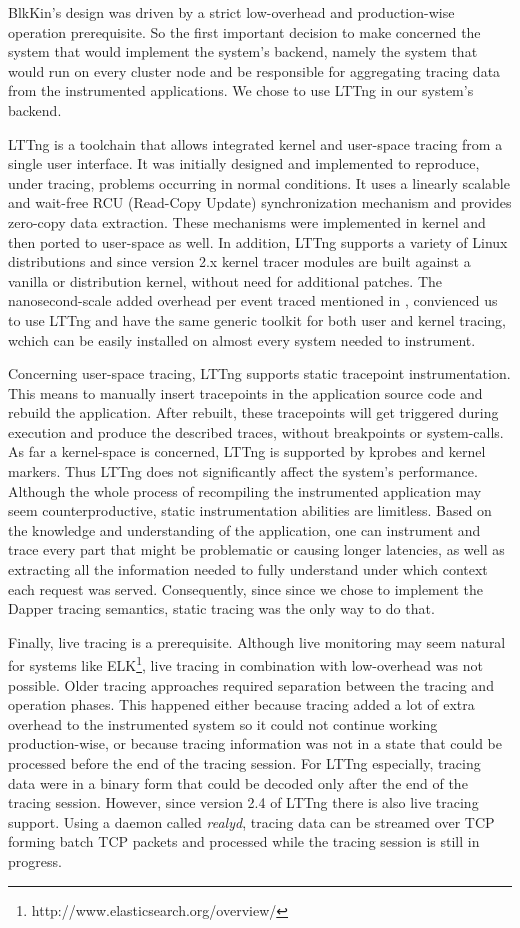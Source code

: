 \documentclass[a4paper,10pt,twocolumn]{article}
\begin{document}
BlkKin's design was driven by a strict low-overhead and production-wise
operation prerequisite. So the first important decision to make concerned the
system that would implement the system's backend, namely the system that would
run on every cluster node and be responsible for aggregating tracing data from
the instrumented applications. We chose to use LTTng in our system's backend.

LTTng is a toolchain that allows integrated kernel and user-space tracing from
a single user interface. It was initially designed and implemented to
reproduce, under tracing, problems occurring in normal conditions. It uses a
linearly scalable and wait-free RCU (Read-Copy Update) synchronization
mechanism and provides zero-copy data extraction. These mechanisms were
implemented in kernel and then ported to user-space as well. In addition, LTTng
supports a variety of Linux distributions and since version 2.x kernel tracer
modules are built against a vanilla or distribution kernel, without need for
additional patches. The nanosecond-scale added overhead per event traced
mentioned in \cite{desnoyer}, convienced us to use LTTng and have the same
generic toolkit for both user and kernel tracing, wchich can be easily
installed on almost every system needed to instrument. 

Concerning user-space tracing, LTTng supports static tracepoint
instrumentation.  This means to manually insert tracepoints in the application
source code and rebuild the application. After rebuilt, these tracepoints will
get triggered during execution and produce the described traces, without
breakpoints or system-calls. As far a kernel-space is concerned, LTTng is
supported by kprobes\cite{kprobes} and kernel markers\cite{kmarkers}. Thus
LTTng does not significantly affect the system's performance. Although the
whole process of recompiling the instrumented application may seem
counterproductive, static instrumentation abilities are limitless. Based on the
knowledge and understanding of the application, one can instrument and trace
every part that might be problematic or causing longer latencies, as well as
extracting all the information needed to fully understand under which context
each request was served. Consequently, since since we chose to implement the
Dapper tracing semantics, static tracing was the only way to do that.

Finally, live tracing is a prerequisite. Although live monitoring may seem
natural for systems like ELK\footnote{http://www.elasticsearch.org/overview/},
live tracing in combination with low-overhead was not possible. Older tracing
approaches required separation between the tracing and operation phases. This
happened either because tracing added a lot of extra overhead to the
instrumented system so it could not continue working production-wise, or
because tracing information was not in a state that could be processed before
the end of the tracing session. For LTTng especially, tracing data were in a
binary form that could be decoded only after the end of the tracing session.
However, since version 2.4 of LTTng there is also live tracing support. Using a
daemon called \emph{realyd}, tracing data can be streamed over TCP forming
batch TCP packets and processed while the tracing session is still in progress. 
\end{document}
